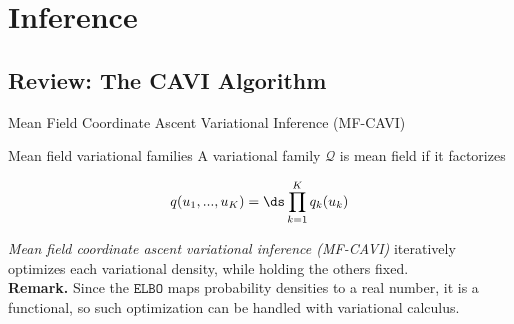 \documentclass[10pt]{beamer}
\renewcommand{\ELBO}{\texttt{ELBO}}
\renewcommand{\Q}{\mathcal{Q}}
\begin{document}
\section{Inference}

\subsection{Review: The CAVI Algorithm}

\begin{frame}{Mean Field Coordinate Ascent Variational Inference (MF-CAVI)}

\begin{block}{Mean field variational families}
A variational family $\Q$ is mean field if it factorizes 

\begin{equation} \label{mean_field}
q(u_1, ..., u_K) = \ds\prod_{k=1}^K q_k(u_k)
\end{equation}
\end{block}

\textit{Mean field coordinate ascent variational inference (MF-CAVI)} iteratively optimizes each variational density, while holding the others fixed. \\
\vfill \vfill 
\pause 
\colorbox{blue!30}{\textbf{Remark.}} Since the $\ELBO$ maps probability densities to a real number, it is a functional, so such optimization can be handled with variational calculus.   
   
\end{frame}
\end{document}
